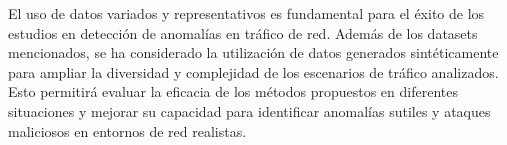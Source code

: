 

El uso de datos variados y representativos es fundamental para el éxito de los estudios en detección de anomalías en tráfico de red. Además de los datasets mencionados, se ha considerado la utilización de datos generados sintéticamente para ampliar la diversidad y complejidad de los escenarios de tráfico analizados. Esto permitirá evaluar la eficacia de los métodos propuestos en diferentes situaciones y mejorar su capacidad para identificar anomalías sutiles y ataques maliciosos en entornos de red realistas.